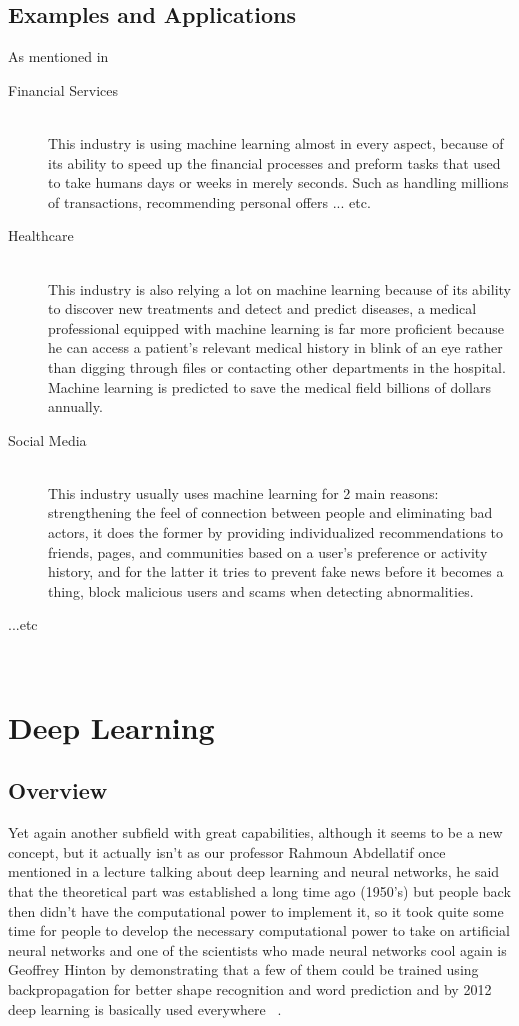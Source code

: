     \subsection{Examples and Applications}
        As mentioned in ~\cite{ml}
        \begin{description}
        \item [Financial Services] \hfill \\
            This industry is using machine learning almost in every aspect, because of its ability to speed up the financial processes and preform tasks that used to take humans days or weeks in merely seconds. Such as handling millions of transactions, recommending personal offers ... etc.
        \item [Healthcare] \hfill \\
            This industry is also relying a lot on machine learning because of its ability to discover new treatments and detect and predict diseases, a medical professional equipped with machine learning is far more proficient because he can access a patient's relevant medical history in blink of an eye rather than digging through files or contacting other departments in the hospital. Machine learning is predicted to save the medical field billions of dollars annually.
        \item [Social Media] \hfill \\
            This industry usually uses machine learning for 2 main reasons: strengthening the feel of connection between people and eliminating bad actors, it does the former by providing individualized recommendations to friends, pages, and communities based on a user's preference or activity history, and for the latter it tries to prevent fake news before it becomes a thing, block malicious users and scams when detecting abnormalities.

        \item [...etc] \hfill \\
        \end{description}

        \section{Deep Learning}
        \subsection{Overview}
            Yet again another subfield with great capabilities, although it seems to be a new concept, but it actually isn't as our professor Rahmoun Abdellatif once mentioned in a lecture talking about deep learning and neural networks, he said that the theoretical part was established a long time ago (1950's) but people back then didn't have the computational power to implement it, so it took quite some time for people to develop the necessary computational power to take on artificial neural networks and one of the scientists who made neural networks cool again is Geoffrey Hinton by demonstrating that a few of them could be trained using backpropagation for better shape recognition and word prediction and by 2012 deep learning is basically used everywhere ~\cite{dl}.
    
